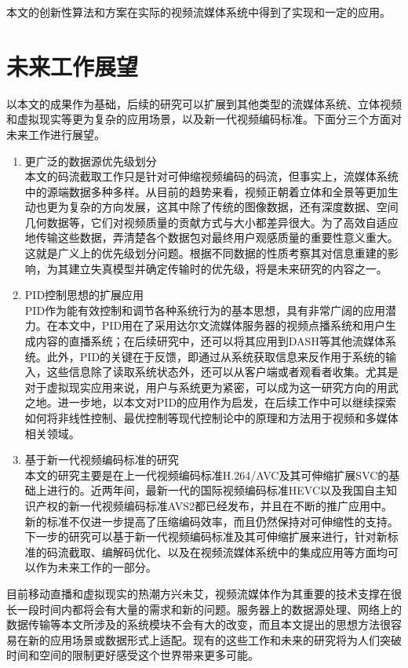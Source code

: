 本文的创新性算法和方案在实际的视频流媒体系统中得到了实现和一定的应用。

\section{未来工作展望}

以本文的成果作为基础，后续的研究可以扩展到其他类型的流媒体系统、立体视频和虚拟现实等更为复杂的应用场景，以及新一代视频编码标准。下面分三个方面对未来工作进行展望。
\begin{enumerate}
\item {更广泛的数据源优先级划分} \\
本文的码流截取工作只是针对可伸缩视频编码的码流，但事实上，流媒体系统中的源端数据多种多样。从目前的趋势来看，视频正朝着立体和全景等更加生动也更为复杂的方向发展，这其中除了传统的图像数据，还有深度数据、空间几何数据等，它们对视频质量的贡献方式与大小都差异很大。为了高效自适应地传输这些数据，弄清楚各个数据包对最终用户观感质量的重要性意义重大。这就是广义上的优先级划分问题。根据不同数据的性质考察其对信息重建的影响，为其建立失真模型并确定传输时的优先级，将是未来研究的内容之一。
\item {PID控制思想的扩展应用} \\
PID作为能有效控制和调节各种系统行为的基本思想，具有非常广阔的应用潜力。在本文中，PID用在了采用达尔文流媒体服务器的视频点播系统和用户生成内容的直播系统；在后续研究中，还可以将其应用到DASH等其他流媒体系统。此外，PID的关键在于反馈，即通过从系统获取信息来反作用于系统的输入，这些信息除了读取系统状态外，还可以从客户端或者观看者收集。尤其是对于虚拟现实应用来说，用户与系统更为紧密，可以成为这一研究方向的用武之地。进一步地，以本文对PID的应用作为启发，在后续工作中可以继续探索如何将非线性控制、最优控制等现代控制论中的原理和方法用于视频和多媒体相关领域。
\item {基于新一代视频编码标准的研究} \\
本文的研究主要是在上一代视频编码标准H.264/AVC及其可伸缩扩展SVC的基础上进行的。近两年间，最新一代的国际视频编码标准HEVC以及我国自主知识产权的新一代视频编码标准AVS2都已经发布，并且在不断的推广应用中。新的标准不仅进一步提高了压缩编码效率，而且仍然保持对可伸缩性的支持。下一步的研究可以基于新一代视频编码标准及其可伸缩扩展来进行，针对新标准的码流截取、编解码优化、以及在视频流媒体系统中的集成应用等方面均可以作为未来工作的一部分。
\end{enumerate}

目前移动直播和虚拟现实的热潮方兴未艾，视频流媒体作为其重要的技术支撑在很长一段时间内都将会有大量的需求和新的问题。服务器上的数据源处理、网络上的数据传输等本文所涉及的系统模块不会有大的改变，而且本文提出的思想方法很容易在新的应用场景或数据形式上适配。现有的这些工作和未来的研究将为人们突破时间和空间的限制更好感受这个世界带来更多可能。